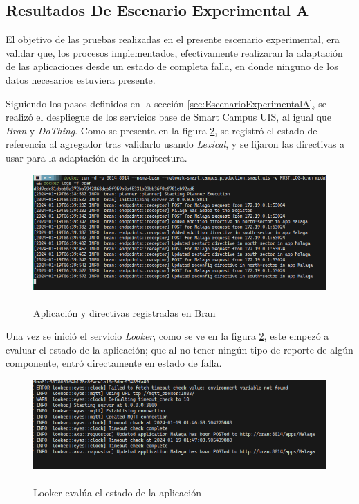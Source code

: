 \subsection{Resultados De Escenario Experimental A}

El objetivo de las pruebas realizadas en el presente escenario experimental, era validar que, los procesos implementados, efectivamente realizaran la adaptación de las aplicaciones desde un estado de completa falla, en donde ninguno de los datos necesarios estuviera presente.

Siguiendo los pasos definidos en la sección \ref{sec:EscenarioExperimentalA}, se realizó el despliegue de los servicios base de Smart Campus UIS, al igual que \textit{Bran} y \textit{DoThing}. Como se presenta en la figura \ref{fig:LookerStart}, se registró el estado de referencia al agregador tras validarlo usando \textit{Lexical}, y se fijaron las directivas a usar para la adaptación de la arquitectura.

\begin{figure}[ht]
    \centering
    \caption{\\Aplicación y directivas registradas en Bran}
    \label{fig:BranStart}
    \includegraphics[width=0.9\linewidth]{images/BranStart.png}
    \vspace{-4mm}
\end{figure}

Una vez se inició el servicio \textit{Looker}, como se ve en la figura \ref{fig:LookerStart}, este empezó a evaluar el estado de la aplicación; que al no tener ningún tipo de reporte de algún componente, entró directamente en estado de falla. 

\begin{figure}[ht]
    \centering
    \caption{\\Looker evalúa el estado de la aplicación}
    \label{fig:LookerStart}
    \includegraphics[width=0.9\linewidth]{images/LookerStart.png}
    \vspace{-4mm}
\end{figure}

